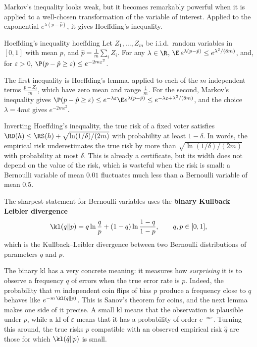 Markov's inequality looks weak, but it becomes remarkably powerful when it is
applied to a well-chosen transformation of the variable of interest. Applied to
the exponential $e^{\lambda(p-\hat p)}$, it gives Hoeffding's inequality.

\begin{lemma}{Hoeffding's inequality \citep{hoeffding1963probability}}{hoeffding}
Let $Z_1,\dots,Z_m$ be i.i.d.\ random variables in $[0,1]$ with mean $p$, and
$\hat p=\frac1m\sum_i Z_i$. For any $\lambda\in\R$,
$\E\,e^{\lambda(p-\hat p)}\leq e^{\lambda^2/(8m)}$, and, for $\varepsilon>0$,
$\P(p-\hat p\geq\varepsilon)\leq e^{-2m\varepsilon^2}$.
\end{lemma}
\begin{proofsketch}
The first inequality is Hoeffding's lemma, applied to each of the $m$
independent terms $\frac{p-Z_i}{m}$, which have zero mean and range $\frac1m$.
For the second, Markov's inequality gives
$\P(p-\hat p\geq\varepsilon)\leq e^{-\lambda\varepsilon}\E e^{\lambda(p-\hat p)}\leq e^{-\lambda\varepsilon+\lambda^2/(8m)}$,
and the choice $\lambda=4m\varepsilon$ gives $e^{-2m\varepsilon^2}$.
\end{proofsketch}

Inverting Hoeffding's inequality, the true risk of a fixed voter satisfies
$\RD(h)\leq\RS(h)+\sqrt{\ln(1/\delta)/(2m)}$ with probability at least
$1-\delta$. In words, the empirical risk underestimates the true risk by more
than $\sqrt{\ln(1/\delta)/(2m)}$ with probability at most $\delta$. This is already
a certificate, but its width does not depend on the value of the risk, which is
wasteful when the risk is small: a Bernoulli variable of mean $0.01$ fluctuates
much less than a Bernoulli variable of mean $0.5$.

The sharpest statement for Bernoulli variables uses the \textbf{binary
Kullback--Leibler divergence}
\[
\kl(q\|p)=q\ln\frac{q}{p}+(1-q)\ln\frac{1-q}{1-p},\qquad q,p\in[0,1],
\]
which is the Kullback--Leibler divergence between two Bernoulli distributions of
parameters $q$ and $p$.

The binary kl has a very concrete meaning: it measures how \emph{surprising} it
is to observe a frequency $q$ of errors when the true error rate is $p$. Indeed,
the probability that $m$ independent coin flips of bias $p$ produce a frequency
close to $q$ behaves like $e^{-m\,\kl(q\|p)}$. This is Sanov's theorem for coins,
and the next lemma makes one side of it precise. A small kl means that the
observation is plausible under $p$, while a kl of $\varepsilon$ means that it has a
probability of order $e^{-m\varepsilon}$. Turning this around, the true risks $p$
compatible with an observed empirical risk $\hat q$ are those for which
$\kl(\hat q\|p)$ is small.


